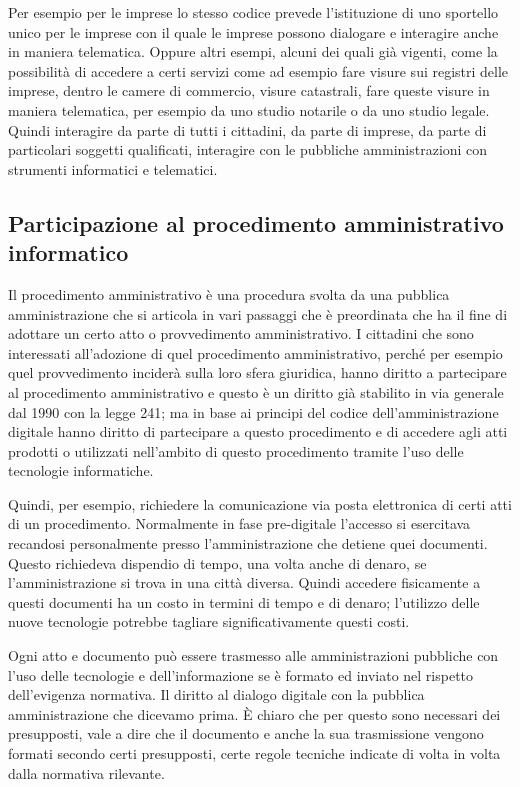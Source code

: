 Per esempio per le imprese lo stesso codice prevede l'istituzione di uno sportello unico per le imprese con il quale le imprese possono dialogare e interagire anche in maniera telematica. Oppure altri esempi, alcuni dei quali già vigenti, come la possibilità di accedere a certi servizi come ad esempio fare visure sui registri delle imprese, dentro le camere di commercio, visure catastrali, fare queste visure in maniera telematica, per esempio da uno studio notarile o da uno studio legale. Quindi interagire da parte di tutti i cittadini, da parte di imprese, da parte di particolari soggetti qualificati, interagire con le pubbliche amministrazioni con strumenti informatici e telematici. 

\subsection{Participazione al procedimento amministrativo informatico}

Il procedimento amministrativo è una procedura svolta da una pubblica amministrazione che si articola in vari passaggi che è preordinata che ha il fine di adottare un certo atto o provvedimento amministrativo. I cittadini che sono interessati all'adozione di quel procedimento amministrativo, perché per esempio quel provvedimento inciderà sulla loro sfera giuridica, hanno diritto a partecipare al procedimento amministrativo e questo è un diritto già stabilito in via generale dal 1990 con la legge 241; ma in base ai principi del codice dell'amministrazione digitale hanno diritto di partecipare a questo procedimento e di accedere agli atti prodotti o utilizzati nell'ambito di questo procedimento tramite l'uso delle tecnologie informatiche. 

Quindi, per esempio, richiedere  la comunicazione via posta elettronica di certi atti di un procedimento. Normalmente in fase pre-digitale l'accesso si esercitava recandosi personalmente presso l'amministrazione che detiene quei documenti. Questo richiedeva dispendio di tempo, una volta anche di denaro, se l'amministrazione si trova in una città diversa. Quindi accedere fisicamente a questi documenti ha un costo in termini di tempo e di denaro; l'utilizzo delle nuove tecnologie potrebbe tagliare significativamente questi costi. 

Ogni atto e documento può essere trasmesso alle amministrazioni pubbliche con l'uso delle tecnologie e dell'informazione se è formato ed inviato nel rispetto dell'evigenza normativa. Il diritto al dialogo digitale con la pubblica amministrazione che dicevamo prima. È chiaro che per questo sono necessari dei presupposti, vale a dire che il documento e anche la sua trasmissione vengono formati secondo certi presupposti, certe regole tecniche indicate di volta in volta dalla normativa rilevante. 

